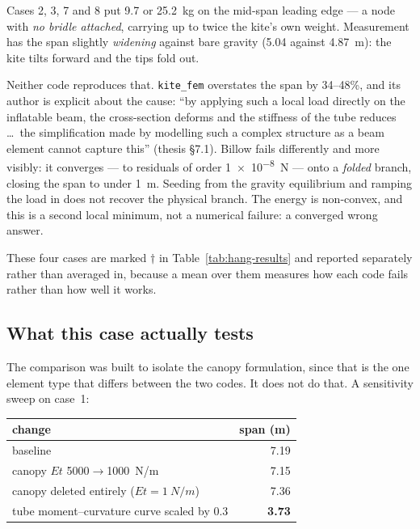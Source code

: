 \documentclass[11pt,a4paper]{article}
\begin{document}
Cases 2, 3, 7 and 8 put \SI{9.7}{} or \SI{25.2}{kg} on the mid-span leading
edge --- a node with \emph{no bridle attached}, carrying up to twice the
kite's own weight. Measurement has the span slightly \emph{widening} against
bare gravity (\SI{5.04}{} against \SI{4.87}{m}): the kite tilts forward and
the tips fold out.

Neither code reproduces that. \texttt{kite\_fem} overstates the span by
34--48\%, and its author is explicit about the cause: ``by applying such a
local load directly on the inflatable beam, the cross-section deforms and the
stiffness of the tube reduces \dots\ the simplification made by modelling such
a complex structure as a beam element cannot capture this'' (thesis \S7.1).
Billow fails differently and more visibly: it converges --- to residuals of
order \SI{1e-8}{N} --- onto a \emph{folded} branch, closing the span to under
\SI{1}{m}. Seeding from the gravity equilibrium and ramping the load in does
not recover the physical branch. The energy is non-convex, and this is a
second local minimum, not a numerical failure: a converged wrong answer.

These four cases are marked $\dagger$ in Table~\ref{tab:hang-results} and reported separately
rather than averaged in, because a mean over them measures how each code
fails rather than how well it works.

\clearpage
\subsection{What this case actually tests}
\label{sec:hang-scope}

The comparison was built to isolate the canopy formulation, since that is the
one element type that differs between the two codes. It does not do that. A
sensitivity sweep on case~1:

\begin{center}
\begin{tabular}{lr}
\toprule
change & span (m) \\
\midrule
baseline & 7.19 \\
canopy $Et$ \SI{5000}{}$\rightarrow$\SI{1000}{N/m} & 7.15 \\
canopy deleted entirely ($Et=\SI{1}{N/m}$) & 7.36 \\
tube moment--curvature curve scaled by $0.3$ & \textbf{3.73} \\
\bottomrule
\end{tabular}
\end{center}
\end{document}
